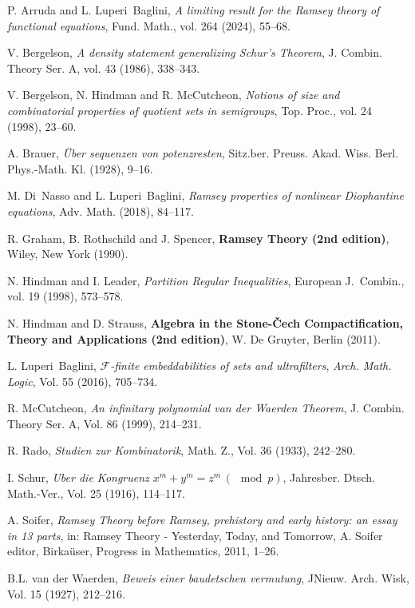 \documentclass[a4paper,oneside]{article}
\newcommand{\F}{\mathcal{F}}
\theoremstyle{definition}
\theoremstyle{named}
\begin{document}
\begin{thebibliography}{}

 P. Arruda and L. {Luperi~Baglini}, \emph{A limiting result for the Ramsey theory of functional equations}, Fund. Math., vol. 264 (2024), 55--68.


 V. Bergelson, \emph{A density statement generalizing Schur's Theorem}, J. Combin. Theory Ser. A, vol. 43 (1986), 338--343.

 V. Bergelson, N. Hindman and R. McCutcheon, \emph{Notions of size and combinatorial properties of quotient sets in semigroups}, Top. Proc., vol. 24 (1998), 23--60.


 A. Brauer, \emph{\"Uber sequenzen von potenzresten}, Sitz.ber. Preuss. Akad. Wiss. Berl. Phys.-Math. Kl. (1928), 9--16.

 M. {Di~Nasso} and L. {Luperi~Baglini}, \emph{Ramsey properties of nonlinear Diophantine equations}, Adv. Math. (2018), 84--117.

 R. Graham, B. Rothschild and J. Spencer, {\bfseries Ramsey Theory (2nd edition)}, Wiley, New York (1990).

 N. Hindman and I. Leader, \emph{Partition Regular Inequalities}, European J.~Combin., vol. 19 (1998), 573--578.

 N. Hindman and D. Strauss, {\bfseries Algebra in the Stone-\v{C}ech
Compactification, Theory and Applications (2nd edition)}, W. De Gruyter, Berlin (2011).
 

 L. {Luperi~Baglini}, \emph{$\F$-finite embeddabilities of sets and ultrafilters}, \emph{Arch. Math. Logic}, Vol. 55 (2016), 705--734.

 R. McCutcheon, \emph{An infinitary polynomial van der Waerden Theorem}, J. Combin. Theory Ser. A, Vol. 86 (1999), 214--231.

 R. Rado, \emph{Studien zur Kombinatorik}, Math. Z., Vol. 36 (1933), 242--280.

 I. Schur, \emph{Uber die Kongruenz 
$x^{m} + y^{m} = z^{m}\, (\!\!\!\mod p)$}, Jahresber. Dtsch. Math.-Ver., Vol. 25 (1916), 114--117.

 A. Soifer, \emph{Ramsey Theory before Ramsey, prehistory and early history: an essay in 13 parts}, in: Ramsey Theory - Yesterday, Today, and Tomorrow, A. Soifer editor, Birka\"user, Progress in Mathematics, 2011, 1--26.

 
 B.L. van der Waerden, \emph{Beweis einer baudetschen vermutung}, JNieuw. Arch. Wisk, Vol. 15 (1927), 212--216.



\end{thebibliography}
\end{document}
